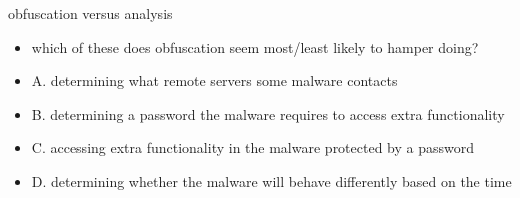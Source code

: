 \begin{frame}{obfuscation versus analysis}
    \begin{itemize}
    \item which of these does obfuscation seem most/least likely
        to hamper doing?
    \vspace{.5cm}
    \item A. determining what remote servers some malware contacts
    \item B. determining a password the malware requires to access extra functionality
    \item C. accessing extra functionality in the malware protected by a password
    \item D. determining whether the malware will behave differently based on the time
    \end{itemize}
\end{frame}
